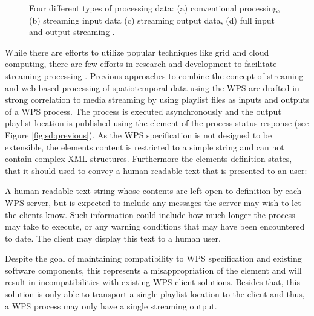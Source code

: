 	\begin{figure}[!htb]
		\centering
		
		\caption{\label{fig:streaming}Four different types of processing data: (a) conventional processing, (b) streaming input data (c) streaming output data, (d) full input and output streaming \citep[based on][]{foerster2012live}.}
	\end{figure}

	While there are efforts to utilize popular techniques like grid and cloud computing, there are few efforts in research and development to facilitate streaming processing \citep{foerster2012live}. Previous approaches to combine the concept of streaming and web-based processing of spatiotemporal data using the \ac{WPS} are drafted in strong correlation to media streaming \citep{foerster2012live} by using playlist files \citep{ietf:draft-pantos-http-live-streaming-12} as inputs and outputs of a \ac{WPS} process. The process is executed asynchronously and the output playlist location is published using the  element of the process status response (see Figure \ref{fig:sd:previous}). As the \ac{WPS} specification is not designed to be extensible, the elements content is restricted to a simple string and can not contain complex \ac{XML} structures. Furthermore the elements definition states, that it should used to convey a human readable text that is presented to an user:
	\begin{signedquote}{\cite{ogc:wps}}
		A human-readable text string whose contents are left open to definition by each WPS server, but is expected to include any messages the server may wish to let the clients know. Such information could include how much longer the process may take to execute, or any warning conditions that may have been encountered to date. The client may display this text to a human user.
	\end{signedquote}
	Despite the goal of maintaining compatibility to \ac{WPS} specification and existing software components, this represents a misappropriation of the element and will result in incompatibilities with existing \ac{WPS} client solutions. Besides that, this solution is only able to transport a single playlist location to the client and thus, a \ac{WPS} process may only have a single streaming output.

